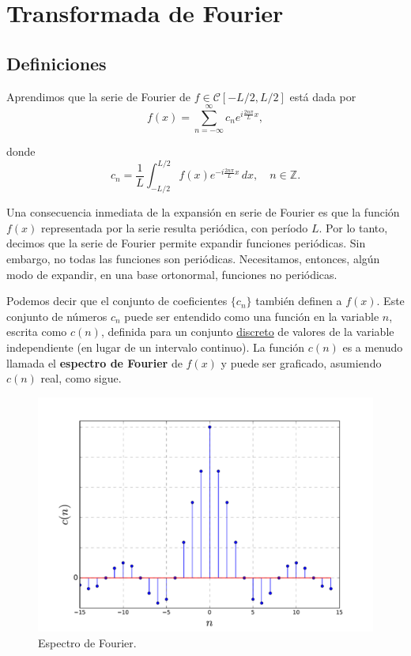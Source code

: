 \chapter{Transformada de Fourier}

\section{Definiciones}

Aprendimos que la serie de Fourier de $f \in \mathcal{C}[-L/2,L/2]$ está dada por 
\begin{equation}
  f(x) = \sum_{n=-\infty}^{\infty} c_n e^{i \frac{2n\pi}{L}x},  \label{Transformada1}
\end{equation}

donde 
\begin{equation}
  c_n = \frac{1}{L} \int_{-L/2}^{L/2} f(x) e^{-i\frac{2n\pi}{L}x} \,dx, \quad n \in \mathbb{Z}. \label{Transformada2}
\end{equation}

Una consecuencia inmediata de la expansión en serie de Fourier es que la función $f(x)$ representada por la serie resulta periódica, con período $L$. Por lo tanto, decimos que la serie de Fourier permite expandir funciones periódicas. Sin embargo, no todas las funciones son periódicas. Necesitamos, entonces, algún modo de expandir, en una base ortonormal, funciones no periódicas. 

Podemos decir que el conjunto de coeficientes $\{c_n\}$ también definen a $f(x)$. Este conjunto de números $c_n$ puede ser entendido como una función en la variable $n$, escrita como $c(n)$, definida para un conjunto \underline{discreto} de valores de la variable independiente (en lugar de un intervalo continuo).  La función $c(n)$ es a menudo llamada el \textbf{espectro de Fourier} de $f(x)$ y puede ser graficado, asumiendo $c(n)$ real, como sigue.

\vspace{-0.5cm}
\begin{figure}[H]
    \centering
    \includegraphics[scale = 0.4]{Figuras/Espectro1.pdf}
    \caption{Espectro de Fourier.}
\end{figure}


